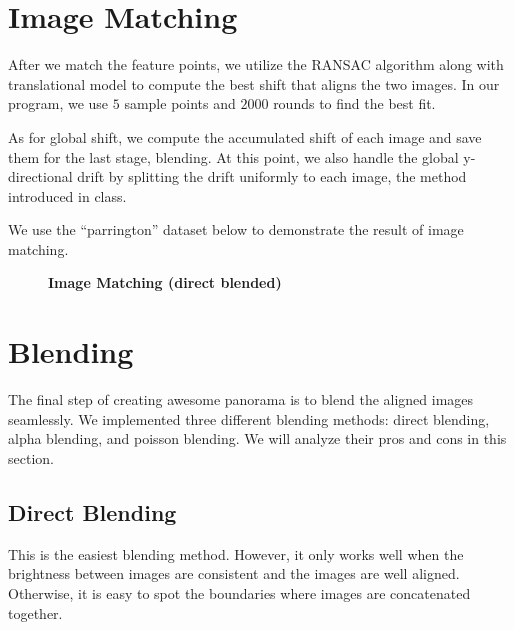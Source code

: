 \documentclass[a4paper]{article}
\begin{document}
\section{Image Matching}
After we match the feature points, we utilize the RANSAC algorithm along with
translational model to compute the best shift that aligns the two images. In our
program, we use $5$ sample points and $2000$ rounds to find the best fit.

As for global shift, we compute the accumulated shift of each image and save them
for the last stage, blending. At this point, we also handle the global y-directional
drift by splitting the drift uniformly to each image, the method introduced in class.

We use the ``parrington'' dataset below to demonstrate the result of image matching.

\begin{figure}[h]
  \centering
  \hfill
  \caption{\textbf{Image Matching (direct blended)}}
  \label{fig:imageMatch}
\end{figure}

\section{Blending}
The final step of creating awesome panorama is to blend the aligned images seamlessly.
We implemented three different blending methods: direct blending, alpha blending,
and poisson blending. We will analyze their pros and cons in this section.

\subsection{Direct Blending}
This is the easiest blending method. However, it only works well when the brightness
between images are consistent and the images are well aligned. Otherwise, it is
easy to spot the boundaries where images are concatenated together.
\end{document}
